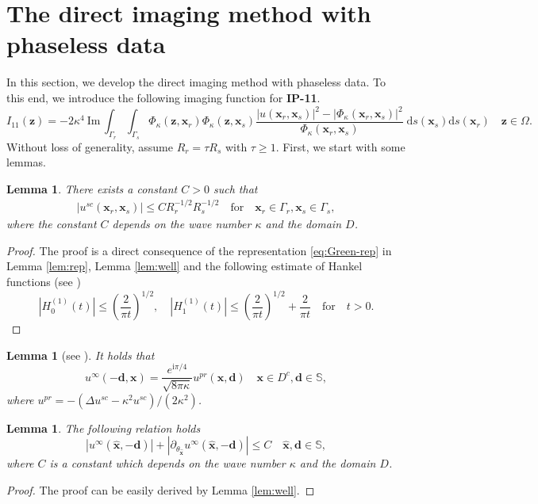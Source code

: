 \documentclass[10pt,a4paper]{article}
\numberwithin{equation}{section}
\newtheorem{lemma}[theorem]{Lemma}
\begin{document}
\section{The direct imaging method with phaseless data}
\label{sec:phaseless}
In this section, we develop the direct imaging method with phaseless data. To this end, we introduce  the following imaging function for \textbf{IP-11}.
\begin{equation*}
I_{11}(\bm{ z }) =  -2 \kappa^4 ~\mathrm{Im}\, \int_{ \Gamma_{r} } \int_{ \Gamma_{s} } \Phi_{\kappa}(\bm{ z },\bm{ x }_r)  \Phi_{\kappa}(\bm{ z },\bm{ x }_s)
\dfrac{| u(\bm{ x }_r,\bm{ x }_s) |^2 - |\Phi_{\kappa}(\bm{ x }_r,\bm{ x }_s)  |^2 }{\Phi_{\kappa}(\bm{ x }_r,\bm{ x }_s)}
\;\mathrm{d}s(\bm{ x }_s)\mathrm{d}s(\bm{ x }_r) \quad
\bm{ z }\in \Omega.
\end{equation*}
Without loss of generality, assume $R_r=\tau R_s$ with $\tau \geq 1$. First, we start with some lemmas.
\begin{lemma}
  There exists a constant $C>0$ such that
  \begin{align*}
    | u^{sc}(\bm{ x }_r, \bm{ x }_s) |  \leq  C R^{-1/2}_r R^{-1/2}_s \quad \mathrm{for} \quad \bm{ x }_r \in \Gamma_r, \bm{ x }_s \in \Gamma_s,
  \end{align*}
  where the constant $C$ depends on the wave number $\kappa$ and the domain $D$.
\end{lemma}
\begin{proof}
  The proof is a direct consequence of the representation \eqref{eq:Green-rep} in Lemma \ref{lem:rep}, Lemma \ref{lem:well} and the following estimate of Hankel functions (see \cite[(3.8)]{chen_phaseless_2017})
  \begin{equation*}
    | H^{(1)}_0 (t)| \leq \left( \dfrac{2}{\pi t} \right)^{1/2}, \quad
    | H^{(1)}_1 (t)| \leq \left( \dfrac{2}{\pi t} \right)^{1/2} + \dfrac{2}{\pi t}
    \quad \text{for} \quad t>0.
    \end{equation*}  
\end{proof}

\begin{lemma}[see \cite{dong_uniqueness_2024}]
  It holds that
  $$
  u^{\infty}(- \bm{ d },\bm{ x })= \dfrac{e^{\mathrm{ i } \pi/4}}{\sqrt{8\pi \kappa}} u^{pr}(\bm{ x }, \bm{ d }) \quad
  \bm{ x } \in D^{c}, \bm{ d } \in \mathbb{S} ,
  $$
  where $u^{pr}= -(\Delta u^{sc}-\kappa^2 u^{sc})/(2 \kappa^2)$.
\end{lemma}

\begin{lemma}
  The following relation holds
\begin{equation*}
  | u^{\infty}(\hat{\bm x},-\bm{ d } ) |  + | \partial_{\theta_{\hat{\bm x}} } u^{\infty}(\hat{\bm x},-\bm{ d } ) |
  \leq C \quad \hat{\bm x}, \bm{ d } \in \mathbb{S}, 
\end{equation*}
where $C$ is a constant which depends on the wave number $\kappa$ and the domain $D$.
\end{lemma}
\begin{proof}
  The proof can be easily derived by Lemma \ref{lem:well}.
\end{proof}
\end{document}
